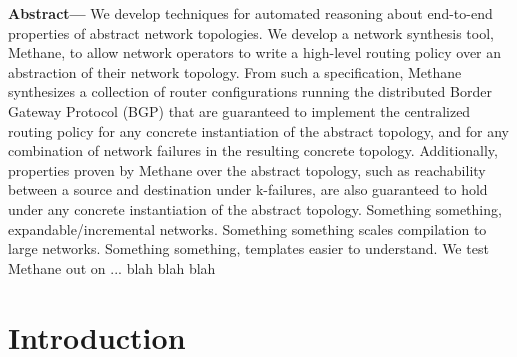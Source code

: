 \documentclass[numbers, 10pt, preprint]{sigplanconf}
\newcommand{\sysname}{{\small \sf Methane}\xspace}
\begin{document}
\textbf{Abstract---}
We develop techniques for automated reasoning about end-to-end properties of abstract network topologies. We develop a network synthesis tool, \sysname, to allow network operators to write a high-level routing policy over an abstraction of their network topology. From such a specification, \sysname synthesizes a collection of router configurations running the distributed Border Gateway Protocol (BGP) that are guaranteed to implement the centralized routing policy for any concrete instantiation of the abstract topology, and for any combination of network failures in the resulting concrete topology.
%
Additionally, properties proven by \sysname over the abstract topology, such as reachability between a source and destination under k-failures, are also guaranteed to hold under any concrete instantiation of the abstract topology.
%
Something something, expandable/incremental networks. Something something scales compilation to large networks. Something something, templates easier to understand.
%
%
We test \sysname out on ... blah blah blah



%
%
%
%




%
%
%
%

\section{Introduction}
\label{sec:introduction}
\end{document}
